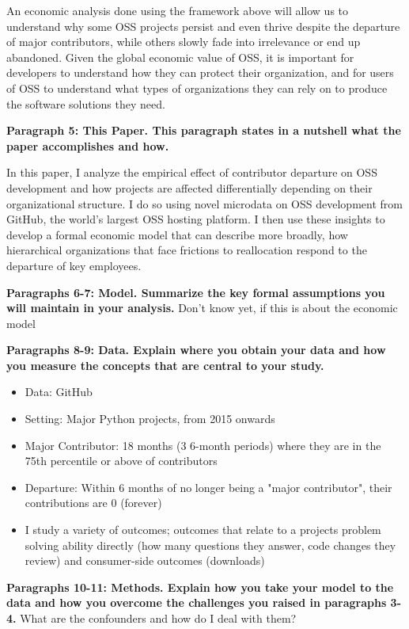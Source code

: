 \documentclass[source/paper/main.tex]{subfiles}
\begin{document}
\qquad An economic analysis done using the framework above will allow us to understand why some OSS projects persist and even thrive despite the departure of major contributors, while others slowly fade into irrelevance or end up abandoned. Given the global economic value of OSS, it is important for developers to understand how they can protect their organization, and for users of OSS to understand what types of organizations they can rely on to produce the software solutions they need. 

\textbf{Paragraph 5: This Paper. This paragraph states in a nutshell what the paper accomplishes and how. }

In this paper, I analyze the empirical effect of contributor departure on OSS development and how projects are affected differentially depending on their organizational structure. I do so using novel microdata on OSS development from GitHub, the world's largest OSS hosting platform. I then use these insights to develop a formal economic model that can describe more broadly, how hierarchical organizations that face frictions to reallocation respond to the departure of key employees. 

\textbf{Paragraphs 6-7: Model. Summarize the key formal assumptions you will maintain in your analysis.}
Don't know yet, if this is about the economic model

\textbf{Paragraphs 8-9: Data. Explain where you obtain your data and how you measure the concepts that are central to your study.}
\begin{itemize}
    \item Data: GitHub
    \item Setting: Major Python projects, from 2015 onwards
    \item Major Contributor: 18 months (3 6-month periods) where they are in the 75th percentile or above of contributors
    \item Departure: Within 6 months of no longer being a "major contributor", their contributions are 0 (forever)
    \item I study a variety of outcomes; outcomes that relate to a projects problem solving ability directly (how many questions they answer, code changes they review) and consumer-side outcomes (downloads) 
\end{itemize}

\textbf{Paragraphs 10-11: Methods. Explain how you take your model to the data and how you overcome the challenges you raised in paragraphs 3-4.}
What are the confounders and how do I deal with them? 
\end{document}
